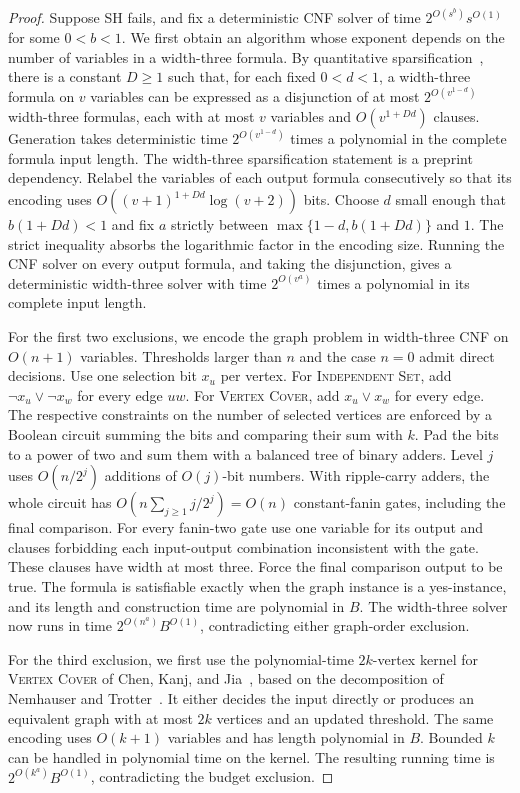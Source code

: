 \documentclass[11pt]{article}
\begin{document}
\begin{proof}
Suppose SH fails, and fix a deterministic CNF solver of time
\(2^{O(s^b)}s^{O(1)}\) for some \(0<b<1\).
We first obtain an algorithm whose exponent depends on the number of
variables in a width-three formula. By quantitative
sparsification~\cite[Lemma~2.2]{sh}, there is a constant \(D\ge1\) such
that, for each fixed \(0<d<1\), a width-three formula on \(v\) variables
can be expressed as a disjunction of at most \(2^{O(v^{1-d})}\)
width-three formulas, each with at most \(v\) variables and
\(O(v^{1+Dd})\) clauses. Generation takes deterministic time
\(2^{O(v^{1-d})}\) times a polynomial in the complete formula input
length. The width-three sparsification statement is a preprint dependency.
Relabel the variables of each output formula consecutively so that its
encoding uses \(O((v+1)^{1+Dd}\log(v+2))\) bits.
Choose \(d\) small enough that \(b(1+Dd)<1\) and fix \(a\) strictly between
\(\max\{1-d,b(1+Dd)\}\) and \(1\). The strict inequality absorbs the
logarithmic factor in the encoding size. Running the CNF solver on
every output formula, and taking the disjunction, gives a deterministic
width-three solver with time \(2^{O(v^a)}\) times a polynomial in its
complete input length.

For the first two exclusions, we encode the graph problem in width-three
CNF on \(O(n+1)\) variables. Thresholds larger than \(n\) and the case
\(n=0\) admit direct decisions. Use one selection bit \(x_u\) per vertex.
For \textsc{Independent Set}, add
\(\neg x_u\lor \neg x_w\) for every edge \(uw\).
For \textsc{Vertex Cover}, add \(x_u\lor x_w\) for every edge.
The respective constraints on the number of selected vertices are
enforced by a Boolean circuit summing the bits and comparing their sum
with \(k\). Pad the bits to a power of two and sum them with a balanced
tree of binary adders. Level \(j\) uses \(O(n/2^j)\) additions of
\(O(j)\)-bit numbers. With ripple-carry adders, the whole circuit has
\(O(n\sum_{j\ge1}j/2^j)=O(n)\) constant-fanin gates, including the
final comparison. For every fanin-two gate use one variable for its
output and clauses forbidding each input-output combination inconsistent
with the gate. These clauses have width at most three. Force the final
comparison output to be true. The formula is satisfiable exactly when
the graph instance is a yes-instance, and its length and construction
time are polynomial in \(B\). The width-three solver now runs in time
\(2^{O(n^a)}B^{O(1)}\), contradicting either graph-order exclusion.

For the third exclusion, we first use the polynomial-time
\(2k\)-vertex kernel for \textsc{Vertex Cover} of Chen, Kanj, and
Jia~\cite[Theorem~2.2]{ckj}, based on the decomposition of Nemhauser and
Trotter~\cite{nt}. It either decides the input directly or produces an
equivalent graph with at most \(2k\) vertices and an updated threshold.
The same encoding uses \(O(k+1)\) variables and has length polynomial in
\(B\). Bounded \(k\) can be handled in polynomial time on the kernel.
The resulting running time is \(2^{O(k^a)}B^{O(1)}\), contradicting
the budget exclusion.
\end{proof}
\end{document}
